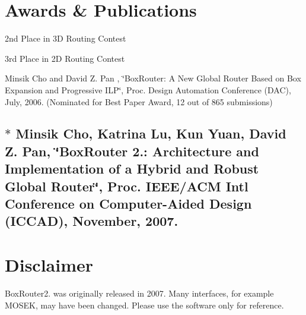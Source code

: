  \section*{Awards \& Publications}


\begin{DoxyItemize}
\item 2nd Place in 3D Routing Contest
\item 3rd Place in 2D Routing Contest
\item Minsik Cho and David Z. Pan , \char`\"{}\+Box\+Router\+: A New Global Router Based on Box Expansion and Progressive I\+L\+P\char`\"{}, Proc. Design Automation Conference (D\+AC), July, 2006. (Nominated for Best Paper Award, 12 out of 865 submissions) \subsection*{$\ast$ Minsik Cho, Katrina Lu, Kun Yuan, David Z. Pan, \char`\"{}\+Box\+Router 2.\+: Architecture and Implementation of a Hybrid and Robust Global Router\char`\"{}, Proc. I\+E\+E\+E/\+A\+CM Int\textquotesingle{}l Conference on Computer-\/\+Aided Design (I\+C\+C\+AD), November, 2007. }
\end{DoxyItemize}

\section*{Disclaimer}

Box\+Router2. was originally released in 2007. Many interfaces, for example M\+O\+S\+EK, may have been changed. Please use the software only for reference. 